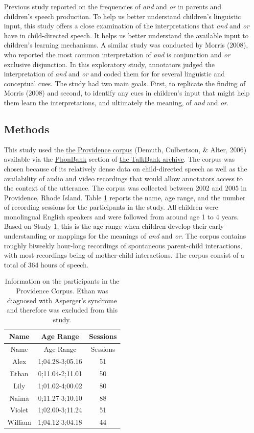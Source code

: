 \documentclass[oneside]{report}
\theoremstyle{definition}
\theoremstyle{definition}
\theoremstyle{definition}
\theoremstyle{remark}
\begin{document}
Previous study reported on the frequencies of \emph{and} and \emph{or}
in parents and children's speech production. To help us better
understand children's linguistic input, this study offers a close
examination of the interpretations that \emph{and} and \emph{or} have in
child-directed speech. It helps us better understand the available input
to children's learning mechanisms. A similar study was conducted by
Morris (2008), who reported the most common interpretation of \emph{and}
is conjunction and \emph{or} exclusive disjunction. In this exploratory
study, annotators judged the interpretation of \emph{and} and \emph{or}
and coded them for for several linguistic and conceptual cues. The study
had two main goals. First, to replicate the finding of Morris (2008) and
second, to identify any cues in children's input that might help them
learn the interpretations, and ultimately the meaning, of \emph{and} and
\emph{or}.

\subsection{Methods}\label{methods-3}

This study used the
\href{https://phonbank.talkbank.org/browser/index.php?url=Eng-NA/Providence/}{the
Providence corpus} (Demuth, Culbertson, \& Alter, 2006) available via
the \href{https://phonbank.talkbank.org}{PhonBank} section of
\href{https://talkbank.org/}{the TalkBank archive}. The corpus was
chosen because of its relatively dense data on child-directed speech as
well as the availability of audio and video recordings that would allow
annotators access to the context of the utterance. The corpus was
collected between 2002 and 2005 in Providence, Rhode Island. Table
\ref{tab:providence} reports the name, age range, and the number of
recording sessions for the participants in the study. All children were
monolingual English speakers and were followed from around age 1 to 4
years. Based on Study 1, this is the age range when children develop
their early understanding or mappings for the meanings of \emph{and} and
\emph{or}. The corpus contains roughly biweekly hour-long recordings of
spontaneous parent-child interactions, with most recordings being of
mother-child interactions. The corpus consist of a total of 364 hours of
speech.
\begin{longtable}[]{@{}ccc@{}}
\caption{\label{tab:providence} Information on the participants in the
Providence Corpus. Ethan was diagnosed with Asperger's syndrome and
therefore was excluded from this study.}\tabularnewline
\toprule
Name & Age Range & Sessions\tabularnewline
\midrule
\endfirsthead
\toprule
Name & Age Range & Sessions\tabularnewline
\midrule
\endhead
Alex & 1;04.28-3;05.16 & 51\tabularnewline
Ethan & 0;11.04-2;11.01 & 50\tabularnewline
Lily & 1;01.02-4;00.02 & 80\tabularnewline
Naima & 0;11.27-3;10.10 & 88\tabularnewline
Violet & 1;02.00-3;11.24 & 51\tabularnewline
William & 1;04.12-3;04.18 & 44\tabularnewline
\bottomrule
\end{longtable}
\end{document}

